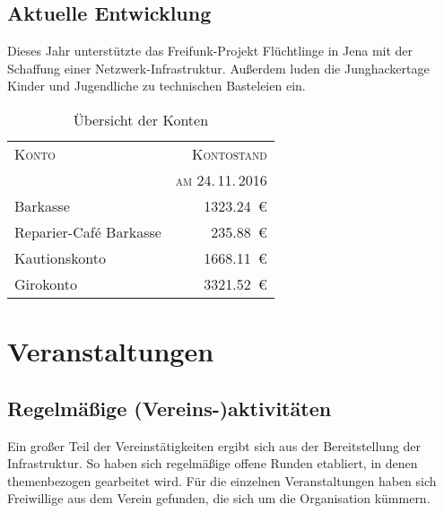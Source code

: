 \documentclass[ngerman]{scrartcl}
\begin{document}
\subsection{Aktuelle Entwicklung}

Dieses Jahr unterstützte das Freifunk-Projekt Flüchtlinge in Jena mit der Schaffung einer Netzwerk-Infrastruktur.
Außerdem luden die Junghackertage Kinder und Jugendliche zu technischen Basteleien ein.

\begin{table}[h!]
	\centering{}
	\begin{tabular}{l|r}
	\toprule
	\textsc{Konto} & \textsc{Kontostand} \\
	& \textsc{am 24.\,11.\,2016} \\
	\midrule
	Barkasse & \num{1323,24}~\euro{} \\
	Reparier-Café Barkasse & \num{235,88}~\euro{} \\
	Kautionskonto & \num{1668,11}~\euro{} \\
	Girokonto & \num{3321,52}~\euro{}\\
	\bottomrule
	\end{tabular}
\caption{Übersicht der Konten}
\end{table}


\section{Veranstaltungen}

\subsection{Regelmäßige (Vereins-)aktivitäten}

Ein großer Teil der Vereinstätigkeiten ergibt sich aus der
Bereitstellung der Infrastruktur. So haben sich regelmäßige offene Runden
etabliert, in denen themenbezogen gearbeitet wird. Für die
einzelnen Veranstaltungen haben sich Freiwillige aus dem Verein
gefunden, die sich um die Organisation kümmern.
\end{document}
